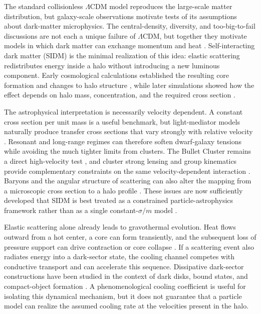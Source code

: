 \documentclass[12pt]{article}
\begin{document}
The standard collisionless $\Lambda$CDM model reproduces the large-scale
matter distribution, but galaxy-scale observations motivate tests of its
assumptions about dark-matter microphysics.  The central-density, diversity,
and too-big-to-fail discussions are not each a unique failure of
$\Lambda$CDM, but together they motivate models in which dark matter can
exchange momentum and heat \citep{BullockBoylan2017}.  Self-interacting dark
matter (SIDM) is the minimal realization of this idea: elastic scattering
redistributes energy inside a halo without introducing a new luminous
component.  Early cosmological calculations established the resulting core
formation and changes to halo structure \citep{Spergel2000,Dave2001,Colin2002},
while later simulations showed how the effect depends on halo mass,
concentration, and the required cross section
\citep{Elbert2015,GarrisonKimmel2013,Tulin2018review}.

The astrophysical interpretation is necessarily velocity dependent.  A
constant cross section per unit mass is a useful benchmark, but light-mediator
models naturally produce transfer cross sections that vary strongly with
relative velocity \citep{TulinYuZurek2013,Kaplinghat2016}.  Resonant and
long-range regimes can therefore soften dwarf-galaxy tensions while avoiding
the much tighter limits from clusters.  The Bullet Cluster remains a direct
high-velocity test \citep{Randall2008}, and cluster strong lensing and group
kinematics provide complementary constraints on the same velocity-dependent
interaction \citep{Andrade2022,Kahlhoefer2014,Sagunski2021}.  Baryons and the
angular structure of scattering can also alter the mapping from a microscopic
cross section to a halo profile \citep{Robertson2017,Shen2021}.  These issues
are now sufficiently developed that SIDM is best treated as a constrained
particle-astrophysics framework rather than as a single constant-$\sigma/m$
model \citep{Adhikari2025}.

Elastic scattering alone already leads to gravothermal evolution.  Heat flows
outward from a hot center, a core can form transiently, and the subsequent
loss of pressure support can drive contraction or core collapse
\citep{Balberg2002,KodaShapiro2011,Nishikawa2020,Outmezguine2023}.  If a
scattering event also radiates energy into a dark-sector state, the cooling
channel competes with conductive transport and can accelerate this sequence.
Dissipative dark-sector constructions have been studied in the context of
dark disks, bound states, and compact-object formation
\citep{Fan2013,WiseZhang2014,Essig2019,Xiao2021}.  A phenomenological cooling
coefficient is useful for isolating this dynamical mechanism, but it does not
guarantee that a particle model can realize the assumed cooling rate at the
velocities present in the halo.
\end{document}
